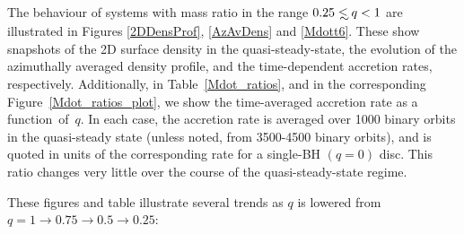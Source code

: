 The behaviour of systems with mass ratio in the range $0.25 \lsim q <
1$ are illustrated in Figures \ref{2DDensProf}, \ref{AzAvDens} and
\ref{Mdott6}.  These show snapshots of the 2D surface density in the
quasi-steady-state, the evolution of the azimuthally averaged density
profile, and the time-dependent accretion rates, respectively.
Additionally, in Table~\ref{Mdot_ratios}, and in the corresponding
Figure~\ref{Mdot_ratios_plot}, we show the time-averaged accretion
rate as a function~of~$q$.  In each case, the accretion rate is
averaged over 1000 binary orbits in the quasi-steady state (unless noted, from 3500-4500 binary orbits), and is quoted in
units of the corresponding rate for a single-BH $(q=0)$ disc. This ratio changes very little over the course of the quasi-steady-state regime.

These figures and table illustrate several trends as $q$ is lowered
from $q=1\rightarrow 0.75 \rightarrow 0.5 \rightarrow 0.25$:

